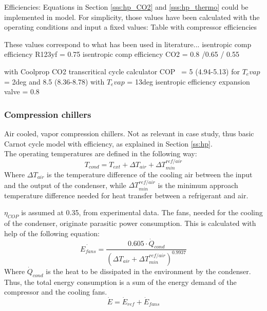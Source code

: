 \documentclass{article}
\begin{document}
Efficiencies: Equations in Section \ref{sss:hp_CO2} and \ref{sss:hp_thermo} could be implemented in model. For simplicity, those values have been calculated with the operating conditions and input a fixed values:
Table with compressor efficiencies



These values correspond to what has been used in literature...
isentropic comp efficiency R123yf = 0.75 \cite{yangTheoreticalExperimentalInvestigation2016}
isentropic comp efficiency CO2 = 0.8 \cite{joneydishariatzadehComparisonTranscriticalCO22016} /0.65 \cite{yangTheoreticalExperimentalInvestigation2016} / 0.55 \cite{steneINTEGRATEDCO2HEAT2007}

with Coolprop CO2 transcritical cycle calculator COP ~= 5 (4.94-5.13) for $T_evap$ = 2deg and 8.5 (8.36-8.78) with $T_evap$ = 13deg
isentropic efficiency expansion valve = 0.8\cite{yangTheoreticalExperimentalInvestigation2016}


\subsubsection{Compression chillers}
Air cooled, vapor compression chillers. Not as relevant in case study, thus basic Carnot cycle model with efficiency, as explained in Section \ref{ss:hp}.\\
The operating temperatures are defined in the following way:
\begin{equation}
    T_{cond} = T_{ext} + \Delta T_{air} + \Delta T_{min}^{ref/air}
\end{equation}
Where $\Delta T_{air}$ is the temperature difference of the cooling air between the input and the output of the condenser, while $\Delta T_{min}^{ref/air}$ is the minimum approach temperature difference needed for heat transfer between a refrigerant and air.

$\eta_{COP}$ is assumed at 0.35, from experimental data\cite{henchozPerformanceProfitabilityPerspectives2015}.
The fans, needed for the cooling of the condenser, originate parasitic power consumption. This is calculated with help of the following equation\cite{henchozPotentialRefrigerantBased}:
\begin{equation}
    \dot{E_{fans}} = \frac{0.605 \cdot \dot{Q}_{cond}}{( \Delta T_{air} + \Delta T_{min}^{ref/air})^{0.9937}}
\end{equation}
Where $\dot{Q}_{cond}$ is the heat to be dissipated in the environment by the condenser. Thus, the total energy consumption is a sum of the energy demand of the compressor and the cooling fans.
\begin{equation}
    \dot{E} = \dot{E}_{ref} + \dot{E}_{fans}
\end{equation}
\end{document}
